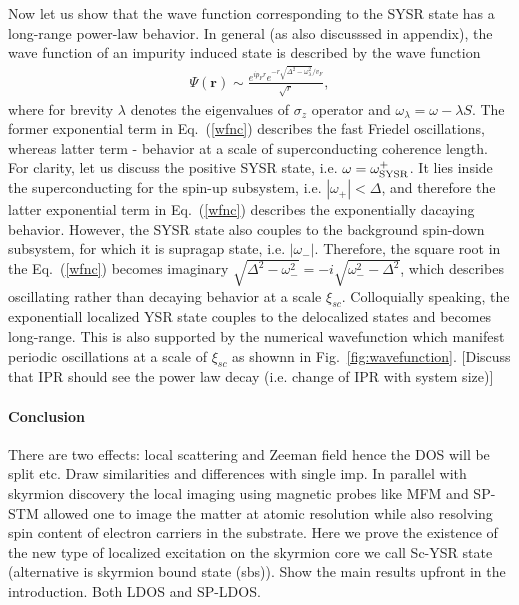 \documentclass[twocolumn,showpacs,floatfix,nofootinbib,longbibliography]{revtex4-1}
\begin{document}
Now let us show that the wave function corresponding to the SYSR state has a long-range power-law behavior. In general (as also discusssed in appendix), the wave function of an impurity induced state is described by the wave function 
\begin{align}
	\Psi(\bm r) \sim \frac{e^{ip_Fr}e^{-r\sqrt{\Delta^2-\omega^2_\lambda}/v_F}}{\sqrt{r}},
	\label{wfnc}
\end{align}
where for brevity $\lambda$ denotes the eigenvalues of $\sigma_z$ operator and $\omega_\lambda = \omega - \lambda S$. The former exponential term in Eq.~(\ref{wfnc}) describes the fast Friedel oscillations, whereas latter term - behavior at a scale of superconducting coherence length. For clarity, let us discuss the positive SYSR state, i.e. $\omega = \omega^{+}_{\rm SYSR}$. It lies inside the superconducting for the spin-up subsystem, i.e. $|\omega_+|<\Delta$, and therefore the latter exponential term in Eq.~(\ref{wfnc}) describes the exponentially dacaying behavior. However, the SYSR state also couples to the background spin-down subsystem, for which it is supragap state, i.e. $|\omega_-|$. Therefore, the square root in the Eq.~(\ref{wfnc}) becomes imaginary $\sqrt{\Delta^2-\omega^2_-}=-i\sqrt{\omega^2_- - \Delta^2}$, which describes oscillating rather than decaying behavior at a scale $\xi_{sc}$. Colloquially speaking, the exponentiall localized YSR state couples to the delocalized states and becomes long-range. This is also supported by the numerical wavefunction which manifest periodic oscillations at a scale of $\xi_{sc}$ as shownn in Fig.~\ref{fig:wavefunction}. [Discuss that IPR should see the power law decay (i.e. change of IPR with system size)] 




\paragraph*{Conclusion} \label{sec:conclusion}

There are two effects: local scattering and Zeeman field hence the DOS will be split etc.  Draw similarities and differences with single imp.
In parallel with skyrmion discovery the local imaging using magnetic probes like MFM and SP-STM allowed one to image the matter at atomic resolution while also resolving spin content of electron carriers in the substrate.  
Here we prove the existence of the new type of localized excitation on the skyrmion core we call  Sc-YSR state (alternative is skyrmion bound state (sbs)).  Show the main results upfront in the introduction. Both LDOS and SP-LDOS. 
\end{document}
